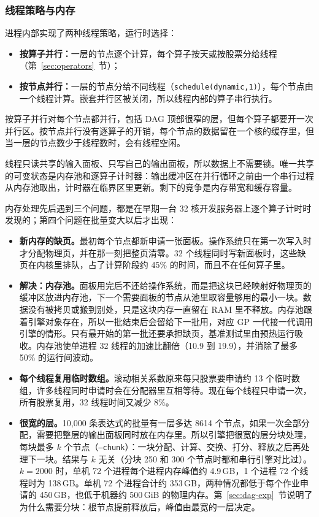 \documentclass[11pt,a4paper,UTF8,fontset=fandol]{ctexart}
\newcommand{\code}[1]{\texttt{#1}}
\begin{document}
\subsubsection{线程策略与内存}
\label{sec:threads}
进程内部实现了两种线程策略，运行时选择：
\begin{itemize}[nosep]
  \item \textbf{按算子并行：}一层的节点逐个计算，每个算子按天或按股票分给线程（第~\ref{sec:operators}~节）；
  \item \textbf{按节点并行：}一层的节点分给不同线程（\code{schedule(dynamic,1)}），每个节点由一个线程计算。嵌套并行区被关闭，所以线程内部的算子串行执行。
\end{itemize}
按算子并行对每个节点都并行，包括 DAG 顶部很窄的层，但每个算子都要开一次并行区。按节点并行没有逐算子的开销，每个节点的数据留在一个核的缓存里，但当一层的节点数少于线程数时，会有线程空闲。

线程只读共享的输入面板、只写自己的输出面板，所以数据上不需要锁。唯一共享的可变状态是内存池和逐算子计时器：输出缓冲区在并行循环之前由一个串行过程从内存池取出，计时器在临界区里更新。剩下的竞争是内存带宽和缓存容量。

内存处理先后遇到三个问题，都是在早期一台 32 核开发服务器上逐个算子计时时发现的；第四个问题在批量变大以后才出现：
\begin{itemize}[nosep]
  \item \textbf{新内存的缺页。}最初每个节点都新申请一张面板。操作系统只在第一次写入时才分配物理页，并在那一刻把整页清零。32 个线程同时写新面板时，这些缺页在内核里排队，占了计算阶段约 45\% 的时间，而且不在任何算子里。
  \item \textbf{解决：内存池。}面板用完后不还给操作系统，而是把这块已经映射好物理页的缓冲区放进内存池，下一个需要面板的节点从池里取容量够用的最小一块。数据没有被拷贝或搬到别处，只是这块内存一直留在 RAM 里不释放。内存池跟着引擎对象存在，所以一批结束后会留给下一批用，对应 GP 一代接一代调用引擎的情形。只有最开始的第一批还要承担缺页，基准测试里由预热运行吸收。内存池使单进程 32 线程的加速比翻倍（10.9 到 19.9），并消除了最多 50\% 的运行间波动。
  \item \textbf{每个线程复用临时数组。}滚动相关系数原来每只股票要申请约 13 个临时数组，许多线程同时申请时会在分配器里互相等待。现在每个线程只申请一次，所有股票复用，32 线程时间又减少 8\%。
  \item \textbf{很宽的层。}10{,}000 条表达式的批量有一层多达 8614 个节点，如果一次全部分配，需要把整层的输出面板同时放在内存里。所以引擎把很宽的层分块处理，每块最多 $k$ 个节点（\code{--chunk}）：一块分配、计算、交换、打分、释放之后再处理下一块。结果与 $k$ 无关（分块 250 和 300 个节点时都和串行引擎对比过）。$k=2000$ 时，单机 72 个进程每个进程内存峰值约 4.9\,GB，1 个进程 72 个线程时为 138\,GB。单机 72 个进程合计约 353\,GB，两种情况都低于每个作业申请的 450\,GB，也低于机器约 500\,GiB 的物理内存。第~\ref{sec:dag-exp}~节说明了为什么需要分块：根节点提前释放后，峰值由最宽的一层决定。
\end{itemize}
\end{document}
